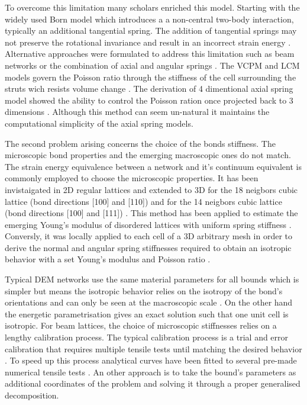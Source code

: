 \documentclass[10pt, onecolumn]{article}
\begin{document}
To overcome this limitation many scholars enriched this model. Starting with the widely used Born model \cite{Born} which introduces a a non-central two-body interaction, typically an additional tangential spring. The addition of tangential springs may not preserve the rotational invariance and result in an incorrect strain energy \cite{rotationalinvariance}. Alternative approaches were formulated to address this limitation such as beam networks \cite{Schlangen1992, SCHLANGEN19961131, PhysRevE.77.051302, ANDRE2012113} or the combination of axial and angular springs \cite{OSTOJASTARZEWSKI199682, WANG2020102469}. The VCPM and LCM models govern the Poisson ratio through the stiffness of the cell surrounding the struts wich resists volume change \cite{Pan2018LatticeReview, Grassl2006}. The derivation of 4 dimentional axial spring model showed the ability to control the Poisson ration once projected back to 3 dimensions \cite{ZHAO2017881}. Although this method can seem un-natural it maintains the computational simplicity of the axial spring models.

The second problem arising concerns the choice of the bonds stiffness. The microscopic bond properties and the emerging macroscopic ones do not match.
The strain energy equivalence between a network and it's continuum equivalent is commonly employed to choose the microscopic properties. It has been invistaigated in 2D regular lattices \cite{OSTOJASTARZEWSKI199682} and extended to 3D for the 18 neigbors cubic lattice (bond directions [100] and [110]) and for the 14 neigbors cubic lattice (bond directions [100] and [111]) \cite{LADD1997349, Kot2015}. This method has been applied to estimate the emerging Young's modulus of disordered lattices with uniform spring stiffness \cite{Kot2015}. Conversly, it was locally applied to each cell of a 3D arbitrary mesh in order to derive the normal and angular spring stiffnesses required to obtain an isotropic behavior with a set Young's modulus and Poisson ratio \cite{Reck2017LatticeSM}. 


Typical DEM networks use the same material parameters for all bounds which is simpler but means the isotropic behavior relies on the isotropy of the bond's orientations and can only be seen at the macroscopic scale \cite{ANDRE2012113}. On the other hand the energetic parametrisation gives an exact solution such that one unit cell is isotropic.
For beam lattices, the choice of microscopic stiffnesses relies on a lengthy calibration process. The typical calibration process is a trial and error calibration that requires multiple tensile tests until matching the desired behavior \cite{ANDRE2012113}. To speed up this process analytical curves have been fitted to several pre-made numerical tensile tests \cite{NGUYEN2019393}. An other approach is to take the bound's parameters as additional coordinates of the problem and solving it through a proper generalised decomposition\cite{GIRARDOT2021993}.
\end{document}
